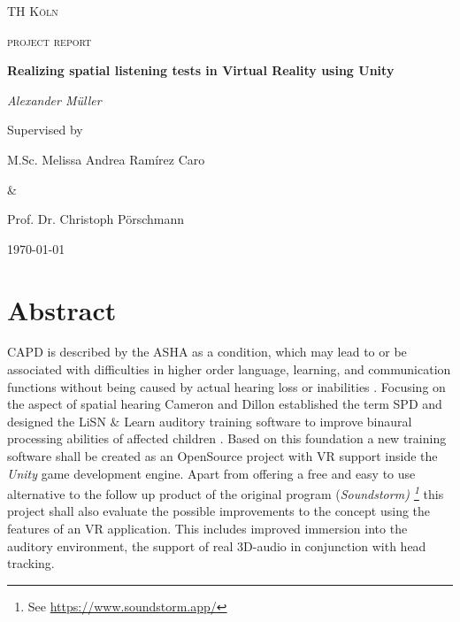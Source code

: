 \documentclass[a4paper,11pt]{article}%
\renewcommand{\\}{\vspace*{0.5\baselineskip} \newline}
\begin{document}

\begin{titlepage}
	\centering
	{\scshape\LARGE TH Köln \par}
	\vspace{1cm}
	{\scshape\Large project report\par}
	\vspace{1.5cm}
	{\huge\bfseries Realizing spatial listening tests in Virtual Reality using Unity\par}
	\vspace{2cm}
	{\Large\itshape Alexander Müller \par}
	\vfill
	Supervised by\par
	M.Sc. Melissa Andrea Ramírez Caro \par \&  \par Prof. Dr. Christoph Pörschmann
	\vfill

	{\large \today\par}
\end{titlepage}


\newpage

\tableofcontents
\newpage



\section{Abstract}
\ac{CAPD} is described by the \ac{ASHA} as a condition, which \dq may lead to or be associated with difficulties in higher order language, learning, and communication functions\dq{} without being caused by actual hearing loss or inabilities \cite{ASHA}. Focusing on the aspect of spatial hearing Cameron and Dillon established the term \ac{SPD} and designed the \ac{LiSN} $\&$ Learn auditory training software to improve binaural processing abilities of affected children \cite{LiSN-A}.
\newline
\newline
Based on this foundation a new training software shall be created as an OpenSource project with \ac{VR} support inside the \textit{Unity} game development engine. Apart from offering a free and easy to use alternative to the follow up product of the original program (\textit{Soundstorm) \footnote{See \url{https://www.soundstorm.app/}}} this project shall also evaluate the possible improvements to the concept using the features of an \ac{VR} application. This includes improved immersion into the auditory environment, the support of real 3D-audio in conjunction with head tracking.
\end{document}
